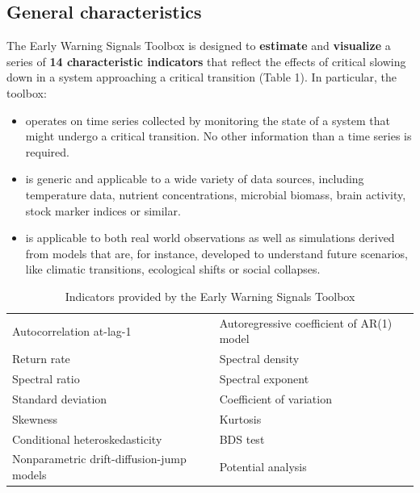 \documentclass[12pt,a4paper,final]{article}
\begin{document}
\subsection{General characteristics}
The Early Warning Signals Toolbox is designed to \textbf{estimate} and \textbf{visualize} a series of \textbf{14 characteristic indicators} that reflect the effects of critical slowing down in a system approaching a critical transition (Table 1). In particular, the toolbox:
\begin{itemize}
\item operates on time series collected by monitoring the state of a system that might undergo a critical transition. No other information than a time series is required. 
\item is generic and applicable to a wide variety of data sources, including temperature data, nutrient concentrations, microbial biomass, brain activity, stock marker indices or similar.
\item is applicable to both real world observations as well as simulations derived from models that are, for instance, developed to understand future scenarios, like climatic transitions, ecological shifts or social collapses.
\end{itemize}


\begin{table}[h]
\centering
\caption{Indicators provided by the Early Warning Signals Toolbox}%
\begin{tabular}{l l}%
\hline
\hline
Autocorrelation at-lag-1 &	%
Autoregressive coefficient of AR(1) model	\\ %
Return rate &	%
Spectral density \\%
Spectral ratio &	%
Spectral exponent\\	%
Standard deviation &	%
Coefficient of variation\\	%
Skewness &	%
Kurtosis	\\%
Conditional heteroskedasticity	&%
BDS test	\\%
Nonparametric drift-diffusion-jump models	&%
Potential analysis	\\ [0.5ex]%
\hline
\hline
\end{tabular}
\label{methods_table}
\end{table}%
\end{document}

